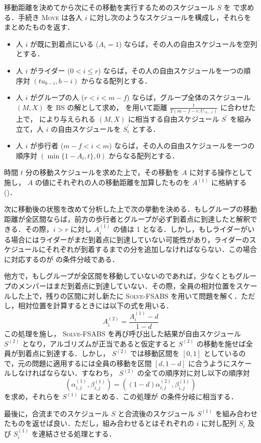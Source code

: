 移動距離を決めてから次にその移動を実行するためのスケジュール $S$ を  で求める．手続き \textsc{Move} は各人 $i$ に対し次のようなスケジュールを構成し，それらをまとめたものを返す．
\begin{itemize}
\item 人 $i$ が既に到着点にいる ($A_i = 1$) ならば，その人の自由スケジュールを空列とする．
\item 人 $i$ がライダー ($0 < i \leq r$) ならば，その人の自由スケジュールを一つの順序対 $(tu_{b-i}, b-i)$ からなる配列とする．
\item 人 $i$ がグループの人 ($r < i < m - f$) ならば，グループ全体のスケジュール $(M, X)$ を BS の解として求め，  を用いて距離 $\frac{t}{T(m - f - r, U_{:b-r})}$ に合わせた上で，  により与えられる  $(M, X)$ に相当する自由スケジュール $S^\prime$ を組み立て，人 $i$ の自由スケジュールを $S^\prime_i$ とする．
\item 人 $i$ が歩行者 ($m - f < i < m$) ならば，その人の自由スケジュールを一つの順序対 $(\min \{ 1 - A_i, t \}, 0)$ からなる配列とする．
\end{itemize}
時間 $t$ 分の移動スケジュールを求めた上で，その移動を $A$ に対する操作として施し， $A$ の値にそれぞれの人の移動距離を加算したものを $A^{(1)}$ に格納する ()．

次に移動後の状態を改めて分析した上で次の挙動を決める．もしグループの移動距離が全区間ならば，前方の歩行者とグループが必ず到着点に到達したと解釈できる．その際，$i > r$ に対し $A^{(1)}_i$ の値は 1 となる．しかし，もしライダーがいる場合にはライダーがまだ到着点に到達していない可能性があり，ライダーのスケジュールにそれぞれが到着するまでの分を追加しなければならない．この場合に対応するのが  の条件分岐である．

他方で，もしグループが全区間を移動していないのであれば，少なくともグループのメンバーはまだ到着点に到達していない．その際，全員の相対位置をスケールした上で，残りの区間に対し新たに \textsc{Solve-FSABS} を用いて問題を解く．ただし，相対位置を計算するときには以下の式を用いる．
\begin{equation}
  A^{(2)}_i = \frac{A^{(1)}_i - d}{1 - d}
\end{equation}
この処理を施し， \textsc{Solve-FSABS} を再び呼び出した結果が自由スケジュール $S^{(2)}$ となり，アルゴリズムが正当であると仮定すると $S^{(2)}$ の移動を施せば全員が到着点に到達する．しかし， $S^{(2)}$ では移動区間を $[0, 1]$ としているので，元の問題に適用するには全員の移動を区間 $[d, 1 -d]$ に合うようにスケールしなければならない．すなわち， $S^{(2)}$ の全ての順序対に対し以下の順序対
\begin{equation}
  (\alpha^{(1)}_{i, j}, \beta^{(1)}_{i,j}) = ((1 - d)\alpha^{(2)}_{i,j}, \beta^{(1)}_{i,j})
\end{equation}
を求め，それらを $S^{(1)}$ にまとめる．この処理が  の条件分岐に相当する．

最後に，合流までのスケジュール $S$ と合流後のスケジュール $S^{(1)}$ を組み合わせたものを返せば良い．ただし，組み合わせるとはそれぞれの $i$ に対し配列 $S_i$ 及び $S^{(1)}_i$ を連結させる処理とする．